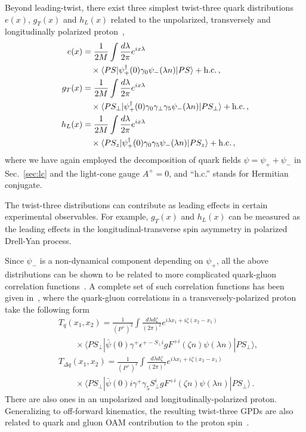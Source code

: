 \documentclass[aps,rmp,reprint,amsmath,amssymb,graphicx,longbibliography]{revtex4-1} %
\newcommand{\nn}{\nonumber}
\begin{document}
Beyond leading-twist, there exist three simplest twist-three quark distributions
$e(x)$, $g_T(x)$ and $h_L(x)$ related to the unpolarized, transversely and longitudinally polarized
proton~\cite{Jaffe:1991ra},
\begin{align}
	e(x) &= \frac{1}{2M}\int \frac{d\lambda}{2\pi}e^{ix\lambda} \\
	&\quad\times \langle PS|\psi^\dagger_+(0)\gamma_0\psi_-(\lambda n)|PS\rangle + {\rm h.c.}  \,, \nn\\
	g_T(x)& = \frac{1}{2M}\int \frac{d\lambda}{2\pi}e^{ix\lambda}  \\
	&\quad\times \langle PS_\perp|\psi^\dagger_+(0)\gamma_0\gamma_\perp\gamma_5\psi_-(\lambda n)|PS_\perp\rangle + {\rm h.c.} \,,\nn\\
	h_L(x)&  =\frac{1}{2M}\int \frac{d\lambda}{2\pi} e^{ix\lambda} \\
	&\quad\times \langle PS_z|\psi^\dagger_+(0)\gamma_0\gamma_5\psi_-(\lambda n)|PS_z\rangle + {\rm h.c.}  \,,\nn
	\label{eq:twist3}
\end{align}
where we have again employed the decomposition of quark fields $\psi=\psi_+ +\psi_-$ in Sec.~\ref{sec:lc} and the light-cone gauge $A^+=0$, and ``h.c.'' stands for Hermitian conjugate.

The twist-three distributions can contribute as leading effects in certain experimental observables. For example, $g_T(x)$ and $h_L(x)$ can be measured as the leading effects in the longitudinal-transverse spin asymmetry in polarized Drell-Yan process.

Since $\psi_-$ is a non-dynamical component depending on $\psi_+$, all the above distributions can be shown to be related to more complicated quark-gluon correlation functions~\cite{Ji:1990br,Balitsky:1996uh}. A complete set of such correlation functions has been given in~\cite{Qiu:1991pp,Ji:1992eu,Ji:2001bm,Kang:2008ey}, where the quark-gluon correlations
in a transversely-polarized proton take the following form
\begin{align}
	&T_q(x_1, x_2)=\frac{1}{(P^+)^2}\int\frac{d\lambda d\zeta}{(2\pi)^2}e^{i\lambda x_1+i\zeta(x_2-x_1)}\\
	&\hspace{2em}\times\langle PS_\perp|\bar\psi(0)\gamma^+ \epsilon^{+-S_\perp i}g F^{+i}(\zeta n)\psi(\lambda n)|PS_\perp\rangle,\nn\\
	&T_{\Delta q}(x_1, x_2)=\frac{1}{(P^+)^2}\int\frac{d\lambda d\zeta}{(2\pi)^2}e^{i\lambda x_1+i\zeta(x_2-x_1)}\\
	&\hspace{2em}\times\langle PS_\perp|\bar\psi(0)i\gamma^+\gamma_5 S^i_\perp g F^{+i}(\zeta n)\psi(\lambda n)|PS_\perp\rangle\,.\nn
\end{align}
There are also ones in an unpolarized and longitudinally-polarized proton.
Generalizing to off-forward kinematics, the resulting twist-three GPDs are also related to quark
and gluon OAM contribution to the proton spin~\cite{Hatta:2012cs,Ji:2012ba}.
\end{document}
